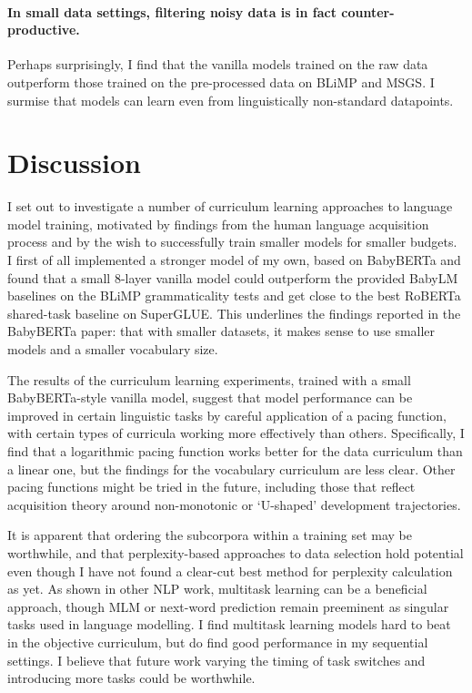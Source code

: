 \paragraph{In small data settings, filtering noisy data is in fact counter-productive.} Perhaps surprisingly, I find that the vanilla models trained on the raw data outperform those trained on the pre-processed data on BLiMP and MSGS. I surmise that models can learn even from linguistically non-standard datapoints.

\section{Discussion}\label{sec:discussion}

I set out to investigate a number of curriculum learning approaches to language model training, motivated by findings from the human language acquisition process and by the wish to successfully train smaller models for smaller budgets. I first of all implemented a stronger model of my own, based on BabyBERTa \citep{huebner2021babyberta} and found that a small 8-layer vanilla model could outperform the provided BabyLM baselines on the BLiMP grammaticality tests and get close to the best RoBERTa shared-task baseline on SuperGLUE. This underlines the findings reported in the BabyBERTa paper: that with smaller datasets, it makes sense to use smaller models and a smaller vocabulary size.

The results of the curriculum learning experiments, trained with a small BabyBERTa-style vanilla model, suggest that model performance can be improved in certain linguistic tasks by careful application of a pacing function, with certain types of curricula working more effectively than others. Specifically, I find that a logarithmic pacing function works better for the data curriculum than a linear one, but the findings for the vocabulary curriculum are less clear. Other pacing functions might be tried in the future, including those that reflect acquisition theory around non-monotonic or `U-shaped' development trajectories.

It is apparent that ordering the subcorpora within a training set may be worthwhile, and that perplexity-based approaches to data selection hold potential even though I have not found a clear-cut best method for perplexity calculation as yet. As shown in other NLP work, multitask learning can be a beneficial approach, though MLM or next-word prediction remain preeminent as singular tasks used in language modelling. I find multitask learning models hard to beat in the objective curriculum, but do find good performance in my sequential settings. I believe that future work varying the timing of task switches and introducing more tasks could be worthwhile.

